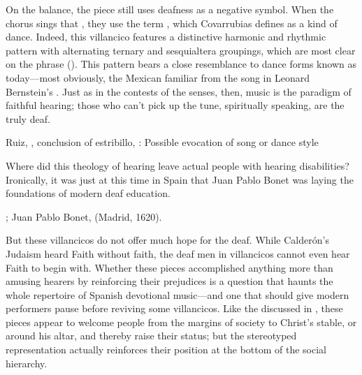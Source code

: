 
On the balance, the piece still uses deafness as a negative symbol.  
When the chorus sings that , they use the term , which Covarrubias defines
as a kind of dance.
Indeed, this villancico features a distinctive harmonic and rhythmic pattern
with alternating ternary and sesquialtera groupings, which are most clear on the
phrase 
().
This pattern bears a close resemblance to dance forms known as 
today---most obviously, the Mexican  familiar from the song
 in Leonard Bernstein's .%
    \Autocites
    []{Grove}
    {Wells:WestSideStory}
Just as in the contests of the senses, then, music is the paradigm of faithful
hearing; those who can't pick up the tune, spiritually speaking, are the truly
deaf.


{Ruiz, , conclusion of estribillo,
: Possible evocation of  song or dance style}

Where did this theology of hearing leave actual people with hearing
disabilities? 
Ironically, it was just at this time in Spain that Juan Pablo Bonet was laying
the foundations of modern deaf education.%
\begin{Footnote}
    \Autocite{Plann:DeafEducationSpain};
    Juan Pablo Bonet,  (Madrid, 1620).
\end{Footnote}
But these villancicos do not offer much hope for the deaf.
While Calderón's Judaism heard Faith without faith, the deaf men in villancicos
cannot even hear Faith to begin with.
Whether these pieces accomplished anything more than amusing hearers by
reinforcing their prejudices is a question that haunts the whole repertoire of
Spanish devotional music---and one that should give modern performers pause
before reviving some villancicos.%
    \Autocite[7]{Cashner:WLSCM32}
Like the  discussed in , these pieces
appear to welcome people from the margins of society to Christ's stable, or
around his altar, and thereby raise their status; but the stereotyped
representation actually reinforces their position at the bottom of the social
hierarchy.

